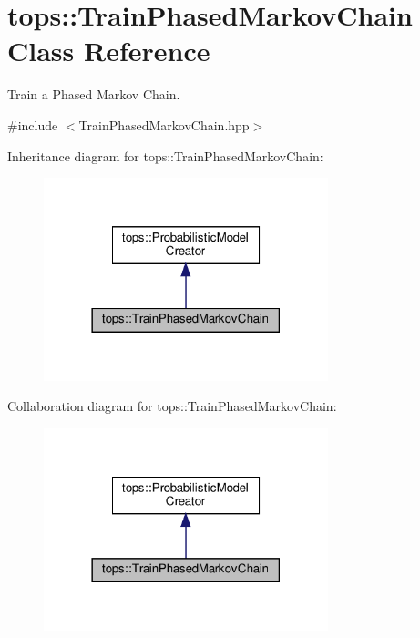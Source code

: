 \hypertarget{classtops_1_1TrainPhasedMarkovChain}{}\section{tops\+:\+:Train\+Phased\+Markov\+Chain Class Reference}
\label{classtops_1_1TrainPhasedMarkovChain}


Train a Phased Markov Chain.  




{\ttfamily \#include $<$Train\+Phased\+Markov\+Chain.\+hpp$>$}



Inheritance diagram for tops\+:\+:Train\+Phased\+Markov\+Chain\+:
\nopagebreak
\begin{figure}[H]
\begin{center}
\leavevmode
\includegraphics[width=234pt]{classtops_1_1TrainPhasedMarkovChain__inherit__graph}
\end{center}
\end{figure}


Collaboration diagram for tops\+:\+:Train\+Phased\+Markov\+Chain\+:
\nopagebreak
\begin{figure}[H]
\begin{center}
\leavevmode
\includegraphics[width=234pt]{classtops_1_1TrainPhasedMarkovChain__coll__graph}
\end{center}
\end{figure}
